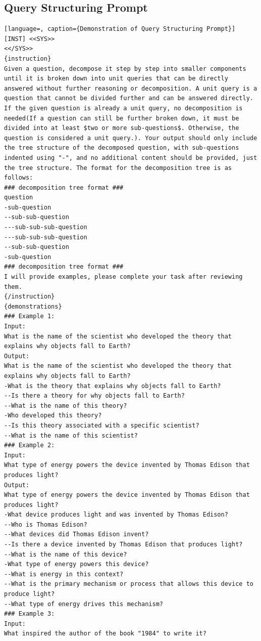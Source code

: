 \documentclass[11pt]{article}
\begin{document}
\subsection{Query Structuring Prompt}
\begin{lstlisting}[language=, caption={Demonstration of Query Structuring Prompt}]
[INST] <<SYS>>
<</SYS>>
{instruction}
Given a question, decompose it step by step into smaller components until it is broken down into unit queries that can be directly answered without further reasoning or decomposition. A unit query is a question that cannot be divided further and can be answered directly. If the given question is already a unit query, no decomposition is needed(If a question can still be further broken down, it must be divided into at least $two or more sub-questions$. Otherwise, the question is considered a unit query.). Your output should only include the tree structure of the decomposed question, with sub-questions indented using "-", and no additional content should be provided, just the tree structure. The format for the decomposition tree is as follows:
### decomposition tree format ###
question
-sub-question
--sub-sub-question
---sub-sub-sub-question
---sub-sub-sub-question
--sub-sub-question
-sub-question
### decomposition tree format ###
I will provide examples, please complete your task after reviewing them.
{/instruction}
{demonstrations}
### Example 1:
Input:
What is the name of the scientist who developed the theory that explains why objects fall to Earth?
Output:
What is the name of the scientist who developed the theory that explains why objects fall to Earth?
-What is the theory that explains why objects fall to Earth?
--Is there a theory for why objects fall to Earth?
--What is the name of this theory?
-Who developed this theory?
--Is this theory associated with a specific scientist?
--What is the name of this scientist?
### Example 2:
Input:
What type of energy powers the device invented by Thomas Edison that produces light?
Output:
What type of energy powers the device invented by Thomas Edison that produces light?
-What device produces light and was invented by Thomas Edison?
--Who is Thomas Edison?
--What devices did Thomas Edison invent?
--Is there a device invented by Thomas Edison that produces light?
--What is the name of this device?
-What type of energy powers this device?
--What is energy in this context?
--What is the primary mechanism or process that allows this device to produce light?
--What type of energy drives this mechanism?
### Example 3:
Input:
What inspired the author of the book "1984" to write it?

\end{lstlisting}
\end{document}
